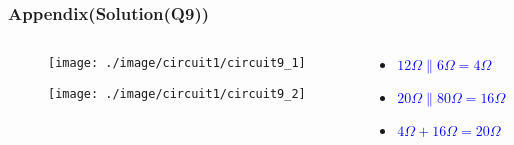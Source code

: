 \documentclass{beamer}
\newcommand{\blue}[1]{\textcolor{blue}{#1}}
\begin{document}
\begin{frame}
\frametitle{Appendix(Solution(Q9))}


\begin{columns}
\begin{column}{8cm}
\begin{figure}[H]
  \texttt{[image: ./image/circuit1/circuit9\_1]}
\end{figure}

\begin{figure}[H]
  \texttt{[image: ./image/circuit1/circuit9\_2]}
\end{figure}
\end{column}

\begin{column}{4cm}
\begin{itemize} \itemsep1pt \parskip0pt 
  \item[] \blue{\bf $12\Omega \parallel 6\Omega = 4\Omega$}
  \item[] \blue{\bf $20\Omega \parallel 80\Omega = 16\Omega$}
\end{itemize}
\vspace{30 mm}
\begin{itemize} \itemsep1pt \parskip0pt 
  \item[] \blue{\bf $4\Omega + 16\Omega = 20\Omega$}
\end{itemize}
\vspace{6 mm}
\end{column}



\end{columns}


\end{frame}

\end{document}

